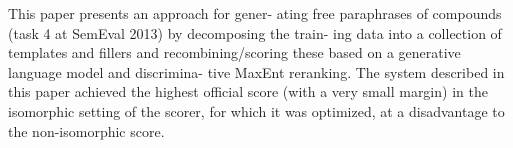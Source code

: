 This paper presents an approach for gener- ating free paraphrases of compounds (task 4
 at SemEval 2013) by decomposing the train-
 ing data into a collection of templates and
 fillers and recombining/scoring these based on
 a generative language model and discrimina-
 tive MaxEnt reranking.
 The system described in this paper achieved
 the highest official score (with a very small margin) in
 the isomorphic setting of the scorer,
 for which it was optimized, at a disadvantage
 to the non-isomorphic score.

